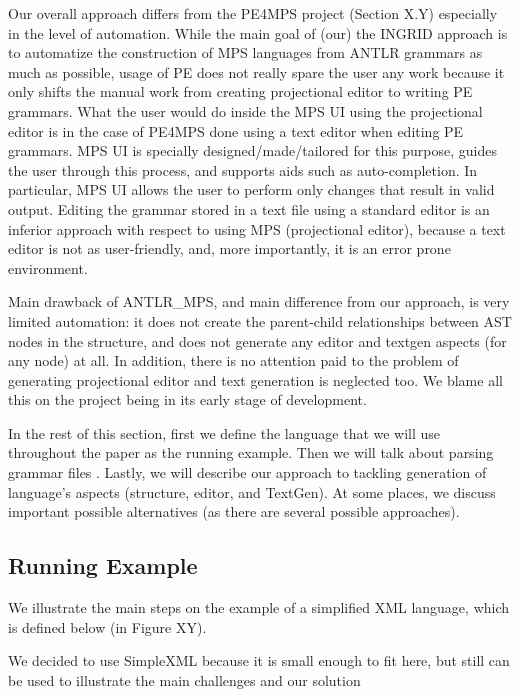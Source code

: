 Our overall approach differs from the PE4MPS project (Section X.Y) especially in the level of automation.
While the main goal of (our) the INGRID approach is to automatize the construction of MPS languages from ANTLR grammars as much as possible, usage of PE does not really spare the user any work because it only shifts the manual work from creating projectional editor to writing PE grammars.
What the user would do inside the MPS UI using the projectional editor is in the case of PE4MPS done using a text editor when editing PE grammars.
MPS UI is specially designed/made/tailored for this purpose, guides the user through this process, and supports aids such as auto-completion. In particular, MPS UI allows the user to perform only changes that result in valid output.
Editing the grammar stored in a text file using a standard editor is an inferior approach with respect to using MPS (projectional editor), because a text editor is not as user-friendly, and, more importantly, it is an error prone environment.

Main drawback of ANTLR{\_}MPS, and main difference from our approach, is very limited automation: it does not create the parent-child relationships between AST nodes in the structure, and does not generate any editor and textgen aspects (for any node) at all.
In addition, there is no attention paid to the problem of generating projectional editor and text generation is neglected too.
We blame all this on the project being in its early stage of development.

In the rest of this section, first we define the language that we will use throughout the paper as the running example.
Then we will talk about parsing grammar files .
Lastly, we will describe our approach to tackling generation of language's aspects (structure, editor, and TextGen).
At some places, we discuss important possible alternatives (as there are several possible approaches).

\subsection{Running Example}

We illustrate the main steps on the example of a simplified XML language, which is defined below (in Figure XY).


We decided to use SimpleXML because it is small enough to fit here, but still can be used to illustrate the main challenges and our solution

